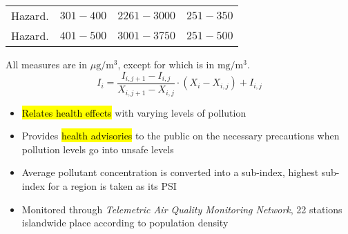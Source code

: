 \documentclass{article}
\begin{document}
\begin{multicols*}{4}
\begin{center}
\begin{tabular}{l|c|c|c}
    Hazard. & $301-400$ & $2261-3000$    & $251-350$           \\
    Hazard. & $401-500$ & $3001-3750$    & $251-500$           \\
\end{tabular}\end{center}
All measures are in $\mu\mathrm{g/m^3}$, except for  which is in
$\mathrm{mg/m^3}$.
$$ I_i = 
    \frac{I_{i, j+1} - I_{i, j}}{X_{i, j+1} - X_{i, j}} 
    \cdot (X_i - X_{i,j})
    + I_{i, j} $$
\begin{itemize} \itemsep -0.5em
    \item \hl{Relates health effects} with varying levels of pollution
    \item Provides \hl{health advisories} to the public on the necessary precautions
        when pollution levels go into unsafe levels
    \item Average pollutant concentration is converted into a sub-index, highest
        sub-index for a region is taken as its PSI
    \item Monitored through \textit{Telemetric Air Quality Monitoring Network}, 22
        stations islandwide place according to population density
\end{itemize}


\end{multicols*}
\end{document}
